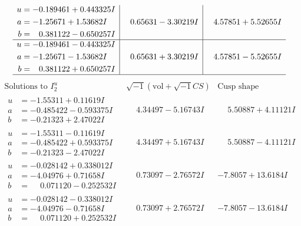 \documentclass[1p]{elsarticle_modified}
\theoremstyle{definition}
\newcommand{\I}{\sqrt{-1}}
\begin{document}
$$\begin{array}{c|c|c}
\begin{aligned}
u &= -0.189461 + 0.443325 I \\
a &= -1.25671 + 1.53682 I \\
b &= \phantom{-}0.381122 - 0.650257 I\end{aligned}
 & \phantom{-}0.65631 - 3.30219 I & \phantom{-}4.57851 + 5.52655 I \\ \hline\begin{aligned}
u &= -0.189461 - 0.443325 I \\
a &= -1.25671 - 1.53682 I \\
b &= \phantom{-}0.381122 + 0.650257 I\end{aligned}
 & \phantom{-}0.65631 + 3.30219 I & \phantom{-}4.57851 - 5.52655 I\\
 \hline 
 \end{array}$$\newpage$$\begin{array}{c|c|c}  
\text{Solutions to }I^u_{2}& \I (\text{vol} + \sqrt{-1}CS) & \text{Cusp shape}\\
 \hline 
\begin{aligned}
u &= -1.55311 + 0.11619 I \\
a &= -0.485422 - 0.593375 I \\
b &= -0.21323 + 2.47022 I\end{aligned}
 & \phantom{-}4.34497 - 5.16743 I & \phantom{-}5.50887 + 4.11121 I \\ \hline\begin{aligned}
u &= -1.55311 - 0.11619 I \\
a &= -0.485422 + 0.593375 I \\
b &= -0.21323 - 2.47022 I\end{aligned}
 & \phantom{-}4.34497 + 5.16743 I & \phantom{-}5.50887 - 4.11121 I \\ \hline\begin{aligned}
u &= -0.028142 + 0.338012 I \\
a &= -4.04976 + 0.71658 I \\
b &= \phantom{-}0.071120 - 0.252532 I\end{aligned}
 & \phantom{-}0.73097 - 2.76572 I & -7.8057 + 13.6184 I \\ \hline\begin{aligned}
u &= -0.028142 - 0.338012 I \\
a &= -4.04976 - 0.71658 I \\
b &= \phantom{-}0.071120 + 0.252532 I\end{aligned}
 & \phantom{-}0.73097 + 2.76572 I & -7.8057 - 13.6184 I \\ \hline\begin{aligned}

\end{aligned}
\end{array}$$
\end{document}
